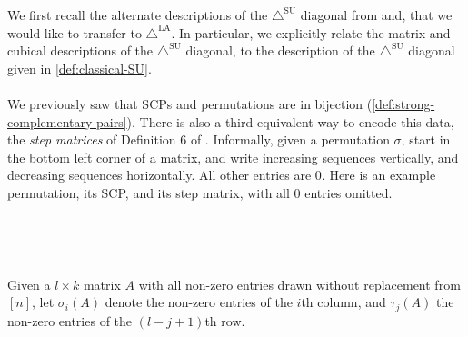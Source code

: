 \documentclass{amsart}
\theoremstyle{definition}
\newcommand{\SUD}{\triangle^{\mathrm{SU}}}
\newcommand{\LAD}{\triangle^{\mathrm{LA}}}
\begin{document}
We first recall the alternate descriptions of the $\SUD$ diagonal from \cite{SaneblidzeUmble04} and\cite{saneblidzeComparingDiagonalsAssociahedra2022}, that we would like to transfer to $\LAD$. 
In particular, we explicitly relate the matrix and cubical descriptions of the $\SUD$ diagonal, to the description of the $\SUD$ diagonal given in \cref{def:classical-SU}.
\\\\
We previously saw that SCPs and permutations are in bijection (\cref{def:strong-complementary-pairs}). 
There is also a third equivalent way to encode this data, the \emph{step matrices} of Definition 6 of \cite{SaneblidzeUmble04}.
Informally, given a permutation $\sigma$, start in the bottom left corner of a matrix, and write increasing sequences vertically, and decreasing sequences horizontally. All other entries are $0$. Here is an example permutation, its SCP, and its step matrix, with all $0$ entries omitted.
{\small
\begin{center}
$\quad \quad$
$\quad \quad$
\end{center}
}
Given a $l\times k$ matrix $A$ with all non-zero entries drawn without replacement from $[n]$, let $\sigma_i(A)$ denote the non-zero entries of the $i$th column, and $\tau_j(A)$ the non-zero entries of the $(l-j+1)$th row. 
\end{document}
